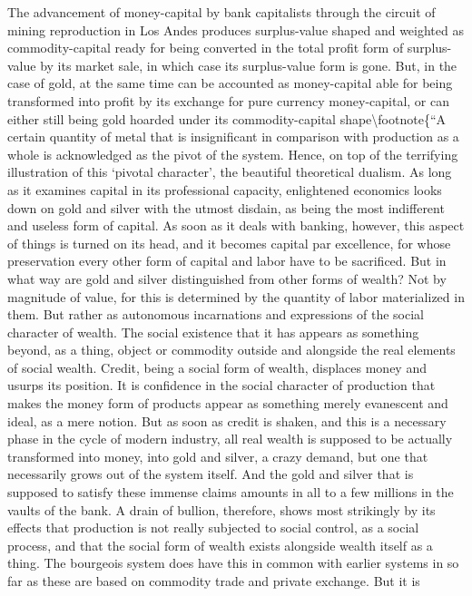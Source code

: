 \documentclass[
]{article}
\begin{document}
The advancement of money-capital by bank capitalists through the circuit
of mining reproduction in Los Andes produces surplus-value shaped and
weighted as commodity-capital ready for being converted in the total
profit form of surplus-value by its market sale, in which case its
surplus-value form is gone. But, in the case of gold, at the same time
can be accounted as money-capital able for being transformed into profit
by its exchange for pure currency money-capital, or can either still
being gold hoarded under its commodity-capital
shape\textbackslash footnote\{``A certain quantity of metal that is
insignificant in comparison with production as a whole is acknowledged
as the pivot of the system. Hence, on top of the terrifying illustration
of this `pivotal character', the beautiful theoretical dualism. As long
as it examines capital in its professional capacity, enlightened
economics looks down on gold and silver with the utmost disdain, as
being the most indifferent and useless form of capital. As soon as it
deals with banking, however, this aspect of things is turned on its
head, and it becomes capital par excellence, for whose preservation
every other form of capital and labor have to be sacrificed. But in what
way are gold and silver distinguished from other forms of wealth? Not by
magnitude of value, for this is determined by the quantity of labor
materialized in them. But rather as autonomous incarnations and
expressions of the social character of wealth. The social existence that
it has appears as something beyond, as a thing, object or commodity
outside and alongside the real elements of social wealth. Credit, being
a social form of wealth, displaces money and usurps its position. It is
confidence in the social character of production that makes the money
form of products appear as something merely evanescent and ideal, as a
mere notion. But as soon as credit is shaken, and this is a necessary
phase in the cycle of modern industry, all real wealth is supposed to be
actually transformed into money, into gold and silver, a crazy demand,
but one that necessarily grows out of the system itself. And the gold
and silver that is supposed to satisfy these immense claims amounts in
all to a few millions in the vaults of the bank. A drain of bullion,
therefore, shows most strikingly by its effects that production is not
really subjected to social control, as a social process, and that the
social form of wealth exists alongside wealth itself as a thing. The
bourgeois system does have this in common with earlier systems in so far
as these are based on commodity trade and private exchange. But it is
\end{document}
